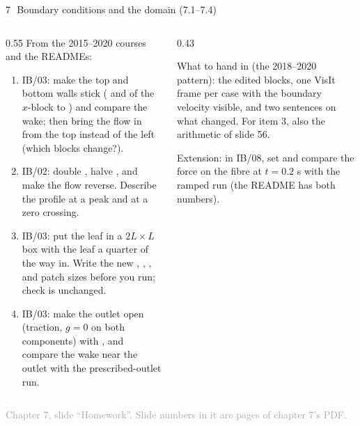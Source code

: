 \documentclass[aspectratio=169,11pt]{beamer}
\newcommand{\sourcecredit}[1]{\vfill\begin{flushright}\tiny\textcolor{DarkGray}{#1}\end{flushright}}
\begin{document}
\begin{frame}{7\,\textbullet\ Boundary conditions and the domain (7.1--7.4)}
\label{fr:c7x1}
\begin{columns}[T,onlytextwidth]
\begin{column}{0.55\textwidth}
\footnotesize From the 2015--2020 courses and the READMEs:
\begin{enumerate}
  \item[7.1] IB/03: make the top and bottom walls stick ( and  of the $x$-block to ) and compare the wake; then bring the flow in from the top instead of the left (which blocks change?).
  \item[7.2] IB/02: double , halve , and make the flow reverse. Describe the profile at a peak and at a zero crossing.
  \item[7.3] IB/03: put the leaf in a $2L \times L$ box with the leaf a quarter of the way in. Write the new , , ,  and patch sizes before you run; check  is unchanged.
  \item[7.4] IB/03: make the outlet open (traction, $g = 0$ on both components) with , and compare the wake near the outlet with the prescribed-outlet run.
\end{enumerate}
\end{column}
\begin{column}{0.43\textwidth}
\begin{punchbox}
\small What to hand in (the 2018--2020 pattern): the edited blocks, one VisIt frame per case with the boundary velocity visible, and two sentences on what changed. For item 3, also the arithmetic of slide 56.
\end{punchbox}
\vspace{2mm}
\small {} Extension: in IB/08, set  and compare the force on the fibre at $t = 0.2$ s with the ramped run (the README has both numbers).
\end{column}
\end{columns}
\sourcecredit{Chapter 7, slide ``Homework''. Slide numbers in it are pages of chapter 7's PDF.}
\end{frame}
\end{document}
